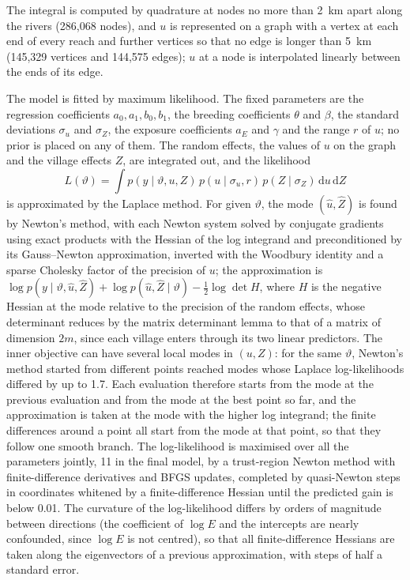 \documentclass[11pt,a4paper]{article}
\newcommand{\dd}{\mathrm{d}}
\begin{document}
The integral is computed by quadrature at nodes no more than 2~km apart along the rivers (286{,}068 nodes), and $u$ is represented on a graph with a vertex at each end of every reach and further vertices so that no edge is longer than 5~km (145{,}329 vertices and 144{,}575 edges); $u$ at a node is interpolated linearly between the ends of its edge.

The model is fitted by maximum likelihood. The fixed parameters are the regression coefficients $a_0, a_1, b_0, b_1$, the breeding coefficients $\theta$ and $\beta$, the standard deviations $\sigma_u$ and $\sigma_Z$, the exposure coefficients $a_E$ and $\gamma$ and the range $r$ of $u$; no prior is placed on any of them. The random effects, the values of $u$ on the graph and the village effects $Z$, are integrated out, and the likelihood
\[
L(\vartheta) = \int p(y \mid \vartheta, u, Z)\, p(u \mid \sigma_u, r)\, p(Z \mid \sigma_Z)\, \dd u\, \dd Z
\]
is approximated by the Laplace method. For given $\vartheta$, the mode $(\hat u, \hat Z)$ is found by Newton's method, with each Newton system solved by conjugate gradients using exact products with the Hessian of the log integrand \citep{steihaug1983} and preconditioned by its Gauss--Newton approximation, inverted with the Woodbury identity and a sparse Cholesky factor of the precision of $u$; the approximation is $\log p(y \mid \vartheta, \hat u, \hat Z) + \log p(\hat u, \hat Z \mid \vartheta) - \tfrac12 \log\det H$, where $H$ is the negative Hessian at the mode relative to the precision of the random effects, whose determinant reduces by the matrix determinant lemma to that of a matrix of dimension $2m$, since each village enters through its two linear predictors. The inner objective can have several local modes in $(u, Z)$: for the same $\vartheta$, Newton's method started from different points reached modes whose Laplace log-likelihoods differed by up to 1.7. Each evaluation therefore starts from the mode at the previous evaluation and from the mode at the best point so far, and the approximation is taken at the mode with the higher log integrand; the finite differences around a point all start from the mode at that point, so that they follow one smooth branch. The log-likelihood is maximised over all the parameters jointly, 11 in the final model, by a trust-region Newton method with finite-difference derivatives and BFGS updates, completed by quasi-Newton steps in coordinates whitened by a finite-difference Hessian until the predicted gain is below 0.01. The curvature of the log-likelihood differs by orders of magnitude between directions (the coefficient of $\log E$ and the intercepts are nearly confounded, since $\log E$ is not centred), so that all finite-difference Hessians are taken along the eigenvectors of a previous approximation, with steps of half a standard error.
\end{document}
